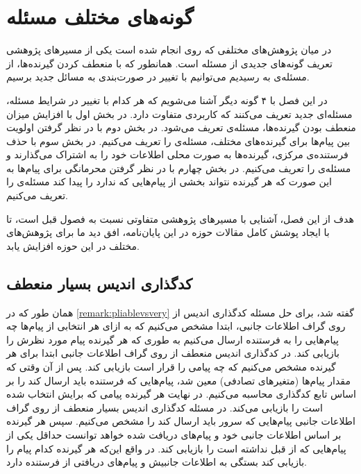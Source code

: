 
\chapter{گونه‌های مختلف مسئله}
\label{chapter:varients}
در میان پژوهش‌های مختلفی که روی 
\picod
انجام شده است یکی از مسیرهای پژوهشی تعریف گونه‌های جدیدی از مسئله است. همانطور که با منعطف کردن گیرنده‌ها، از مسئله‌ی
\icod
به
\picod
رسیدیم می‌توانیم با تغییر در صورت‌بندی
\picod
به مسائل جدید برسیم.

در این فصل با ۴ گونه دیگر آشنا می‌شویم که هر کدام با تغییر در شرایط مسئله، مسئله‌ای جدید تعریف می‌کنند که کاربردی متفاوت دارد. در بخش اول با افزایش میزان منعطف بودن گیرنده‌ها، مسئله‌ی 
 تعریف می‌شود. در بخش دوم با در نظر گرفتن اولویت بین پیام‌ها برای گیرنده‌های مختلف، مسئله‌ی
 را تعریف می‌کنیم. در بخش سوم با حذف فرستنده‌ی مرکزی، گیرنده‌ها به صورت محلی اطلاعات خود را به اشتراک می‌گذارند و مسئله‌ی
 را تعریف می‌کنیم. در بخش چهارم با در نظر گرفتن محرمانگی برای پیام‌ها به این صورت که هر گیرنده نتواند بخشی از پیام‌هایی که ندارد را پیدا کند مسئله‌ی
 را تعریف می‌کنیم.
 
 هدف از این فصل، آشنایی با مسیرهای پژوهشی متفاوتی نسبت به فصول قبل است، تا با ایجاد پوشش کامل مقالات حوزه
 \picod
 در این پایان‌نامه، افق دید ما برای پژوهش‌های مختلف در این حوزه افزایش یابد.
 \pagebreak
\section{کدگذاری اندیس بسیار منعطف}
\label{sec:verypliable}
همان طور که در
\autoref{remark:pliablevsvery}
گفته شد، برای حل مسئله کدگذاری اندیس از روی گراف اطلاعات جانبی، ابتدا مشخص می‌کنیم که به ازای هر انتخابی از پیام‌ها چه پیام‌هایی را به فرستنده ارسال می‌کنیم به طوری که هر گیرنده پیام مورد نظرش را بازیابی کند. در کدگذاری اندیس منعطف از روی گراف اطلاعات جانبی ابتدا برای هر گیرنده مشخص می‌کنیم که چه پیامی را قرار است بازیابی کند.
پس از آن وقتی که مقدار پیام‌ها (متغیرهای تصادفی) معین شد، پیام‌هایی که فرستنده باید ارسال کند را بر اساس تابع کدگذاری محاسبه می‌کنیم. در نهایت هر گیرنده پیامی که برایش انتخاب شده است را بازیابی می‌کند.
در مسئله کدگذاری اندیس بسیار منعطف از روی گراف اطلاعات جانبی پیام‌هایی که سرور باید ارسال کند را مشخص می‌کنیم. سپس هر گیرنده بر اساس اطلاعات جانبی خود و پیام‌های دریافت شده خواهد توانست حداقل یکی از پیام‌هایی که از قبل نداشته است را بازیابی کند. در واقع این‌که هر گیرنده کدام پیام را بازیابی کند بستگی به اطلاعات جانبیش و پیام‌های دریافتی از فرستنده دارد.


